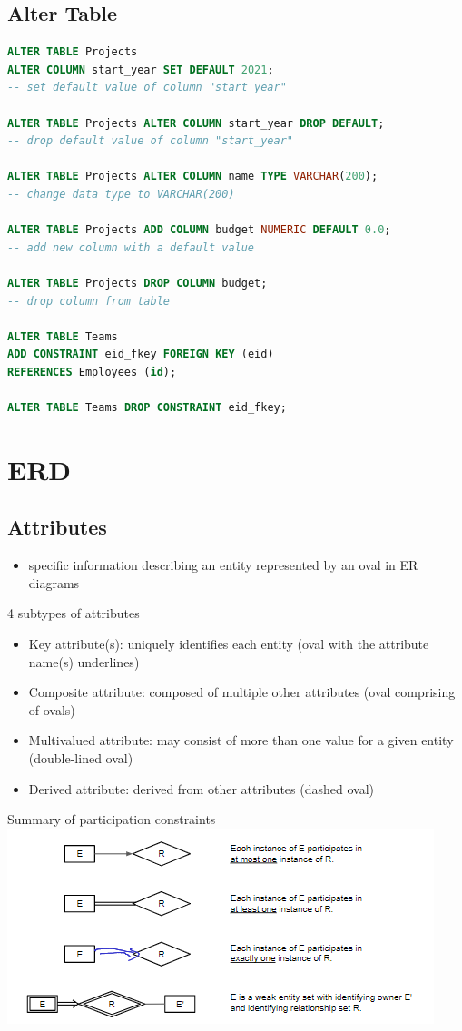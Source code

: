 \documentclass{article}
\begin{document}
\begin{multicols*}{2}
    \subsection*{Alter Table}
    \begin{lstlisting}[language=SQL]
ALTER TABLE Projects 
ALTER COLUMN start_year SET DEFAULT 2021; 
-- set default value of column "start_year"

ALTER TABLE Projects ALTER COLUMN start_year DROP DEFAULT;
-- drop default value of column "start_year"

ALTER TABLE Projects ALTER COLUMN name TYPE VARCHAR(200); 
-- change data type to VARCHAR(200)

ALTER TABLE Projects ADD COLUMN budget NUMERIC DEFAULT 0.0; 
-- add new column with a default value

ALTER TABLE Projects DROP COLUMN budget; 
-- drop column from table

ALTER TABLE Teams 
ADD CONSTRAINT eid_fkey FOREIGN KEY (eid)
REFERENCES Employees (id);

ALTER TABLE Teams DROP CONSTRAINT eid_fkey;

    \end{lstlisting}
    \columnbreak
    \section*{ERD}
    \subsection*{Attributes}
    \begin{itemize}
        \item specific information describing an entity
              represented by an oval in ER diagrams
    \end{itemize}
    4 subtypes of attributes
    \begin{itemize}
        \item Key attribute(s): uniquely identifies each entity (oval with the attribute name(s) underlines)
        \item Composite attribute: composed of multiple
              other attributes (oval comprising of ovals)
        \item Multivalued attribute: may consist of more
              than one value for a given entity (double-lined oval)
        \item Derived attribute: derived from other attributes
              (dashed oval)
    \end{itemize}
    Summary of participation constraints\\
    \includegraphics{summary_of_participation_constraints.png}

\end{multicols*}
\end{document}
